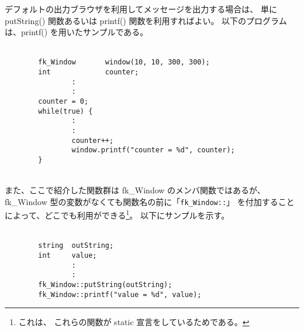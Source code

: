 デフォルトの出力ブラウザを利用してメッセージを出力する場合は、
単に putString() 関数あるいは printf() 関数を利用すればよい。
以下のプログラムは、printf() を用いたサンプルである。\\ ~
\begin{screen}
\begin{verbatim}
        fk_Window       window(10, 10, 300, 300);
        int             counter;
                :
                :
        counter = 0;
        while(true) {
                :
                :
                counter++;
                window.printf("counter = %d", counter);
        }
\end{verbatim}
\end{screen} ~ \\
また、ここで紹介した関数群は fk\_Window のメンバ関数ではあるが、
fk\_Window 型の変数がなくても関数名の前に「\verb+fk_Window::+」
を付加することによって、どこでも利用ができる\footnote{これは、
これらの関数が static 宣言をしているためである。}。
以下にサンプルを示す。\\ ~
\begin{screen}
\begin{verbatim}
        string  outString;
        int     value;
                :
                :
        fk_Window::putString(outString);
        fk_Window::printf("value = %d", value);
\end{verbatim}
\end{screen}
